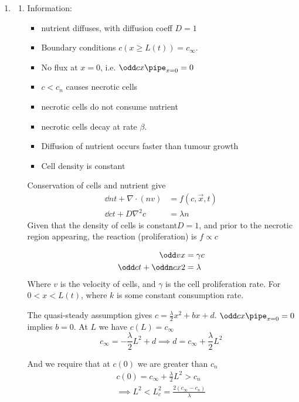 \documentclass{X:/Documents/Coding/Latex/myassignment}
\begin{document}
\begin{enumerate}
\begin{enumerate}
	\end{enumerate}
	\item 
	\begin{enumerate}
		\item Information:
		\begin{itemize}
			\item nutrient diffuses, with diffusion coeff $D=1$
			\item Boundary conditions $c(x \geq L(t)) = c_\infty$.
			\item No flux at $x =0$, i.e. $\odd cx\pipe_{x=0} =0$
			\item $c<c_n$ causes necrotic cells
			\item necrotic cells do not consume nutrient
			\item necrotic cells decay at rate $\beta$.
			\item Diffusion of nutrient occurs faster than tumour growth
			\item Cell density is constant
		\end{itemize}
		Conservation of cells and nutrient give
		\begin{align*}
			\dd nt + \nabla \cdot(nv) &= f(c,\vec x,t)\\
			\dd ct + D\nabla^2 c &= \lambda n
		\end{align*}
		Given that the density of cells is constant$ D=1$, and prior to the necrotic region appearing, the reaction (proliferation) is $f \propto c$
		
		\begin{align*}
			\odd vx &= \gamma c\\
			\odd ct + \oddn cx2 &= \lambda\\
		\end{align*}
		Where $v$ is the velocity of cells, and $\gamma$ is the cell proliferation rate. For $0 < x < L(t)$, where $k$ is some constant consumption rate.

		The quasi-steady assumption gives $c = \frac{\lambda}{2} x^2 + bx + d$. $\odd cx\pipe_{x=0} = 0$ implies $b=0$.
		At $L$ we have $c(L) = c_\infty$ 
		\[c_\infty = -\frac{\lambda}{2} L^2 + d \implies d = c_\infty + \frac{\lambda}{2} L^2\]

		And we require that at $c(0)$ we are greater than $c_n$
		\begin{align*}
			c(0) = c_\infty + \frac{\lambda}{2} L^2 > c_n\\
			\implies L^2 < L^2_c = \frac{2(c_\infty - c_n)}{\lambda}
		\end{align*}


\end{enumerate}
\end{enumerate}
\end{document}
